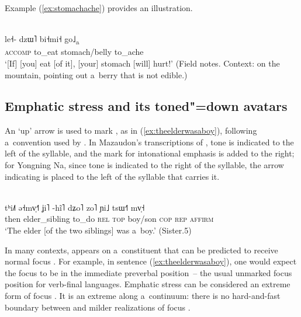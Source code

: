 Example (\ref{ex:stomachache}) provides an illustration. 

\begin{exe}
	\ex
	\label{ex:stomachache}
	\\ 
\gll le˧-			dzɯ˥		bi˧mi˧			go˩\textsubscript{a}\\
\textsc{accomp}		to\_eat 		stomach/belly 		to\_ache\\
  \glt ‘[If] [you] eat [of it], [your] stomach [will] hurt!’ (Field notes. Context: on the mountain, pointing out a~berry that is not edible.)
\end{exe}


\subsection{Emphatic stress and its toned"=down avatars}
\label{sec:emphaticstressanditstoneddownavatars}


An ‘up’ arrow  is used to mark , as in (\ref{ex:theelderwasaboy}), following a~convention used by \citet{mazaudon2004}. In Mazaudon's transcriptions of , tone is indicated to the left of the syllable, and the mark for intonational emphasis is added to the right; for Yongning Na, since tone is indicated to the right of the syllable, the arrow  indicating  is placed to the left of the syllable that carries it.

\begin{exe}
  \ex
  \label{ex:theelderwasaboy}
  \\
  \gll tʰi˩˥		ə˧mv̩˧˥		ʝi˥ 	-hĩ˥		dʑo˥ zo˥ 		ɲi˩ 	tsɯ˧˥	mv̩˧\\
  then 	elder\_sibling	to\_do	\textsc{rel}	\textsc{top} boy/son 	\textsc{cop}
  \textsc{rep}	\textsc{affirm}\\
  \glt ‘The elder [of the two siblings] was a~boy.’ (Sister.5)
\end{exe}

In many contexts,  appears on a~constituent that can be predicted to receive normal focus . For example, in sentence (\ref{ex:theelderwasaboy}), one would expect the focus to be in the immediate preverbal position~-- the usual unmarked focus position for verb-final languages. Emphatic stress can be considered an extreme form of focus . It is an extreme along a~continuum: there is no hard-and-fast {boundary} between  and milder realizations of focus . 

